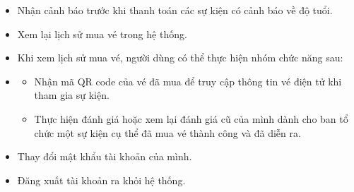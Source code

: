\begin{itemize}
\begin{itemize}
            \item[+] Nhận cảnh báo trước khi thanh toán các sự kiện có cảnh báo về độ tuổi.
            \item[+] Xem lại lịch sử mua vé trong hệ thống.
            \item[+] Khi xem lịch sử mua vé, người dùng có thể thực hiện nhóm chức năng sau: 
            \item[] \begin{itemize}
                \item[1.] Nhận mã QR code của vé đã mua để truy cập thông tin vé điện tử khi tham gia sự kiện.
                \item[2.] Thực hiện đánh giá hoặc xem lại đánh giá cũ của mình dành cho ban tổ chức một sự kiện cụ thể đã mua vé thành công và đã diễn ra.
            \end{itemize}
            \item[+] Thay đổi mật khẩu tài khoản của mình.
            \item[+] Đăng xuất tài khoản ra khỏi hệ thống.
        \end{itemize}
    \end{itemize}
